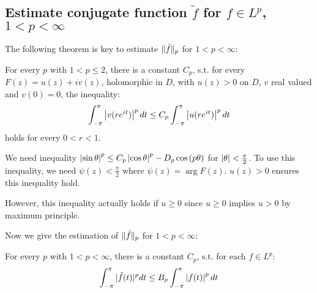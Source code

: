 \subsection{Estimate conjugate function $\tilde{f}$ for $f\in L^p$, $1<p<\infty$}
The following theorem is key to estimate $\lVert\tilde{f}\rVert_p$ for $1<p<\infty$:
\begin{theorem}\label{Marcel Riesz theorem}
    For every $p$ with $1<p\leq 2$, there is a constant $C_p$, s.t. for every $F(z)=u(z)+iv(z)$, holomorphic in $D$, with $u(z)>0$ on $D$, $v$ real valued and $v(0)=0$, the inequality:
    \begin{equation*}
        \int_{-\pi}^{\pi}{\left\lvert v(re^{it})\right\rvert^p d t}\leq C_p \int_{-\pi}^{\pi}{\left\lvert u(re^{it})\right\rvert^p d t}
    \end{equation*}
    holds for every $0<r<1$.
\end{theorem}
\begin{remark}
    We need inequality $\left\lvert\sin{\theta}\right\rvert^p\leq C_p\left\lvert\cos{\theta}\right\rvert^p-D_p\cos{(p\theta)}$ for $\left\lvert\theta\right\rvert<\frac{\pi}{2}$. To use this
    inequality, we need $\psi(z)<\frac{\pi}{2}$ where $\psi(z)=\arg{F(z)}$. $u(z)>0$ ensures this inequality hold.\par
    However, this inequality actually holds if $u\geq 0$ since $u\geq 0$ implies $u>0$ by maximum principle.
\end{remark}
Now we give the estimation of $\lVert\tilde{f}\rVert_p$ for $1<p<\infty$:
\begin{corollary}\label{thm: Marcel Riesz inequality}
    For every $p$ with $1<p<\infty$, there is a constant $C_p$, s.t. for each $f\in L^p$:
    \begin{equation}\label{ieq: Marcel Riesz inequality}
        \int_{-\pi}^{\pi}{\lvert\tilde{f}(t)\rvert^p d t}\leq B_p \int_{-\pi}^{\pi}{\left\lvert f(t)\right\rvert^p d t}
    \end{equation}
\end{corollary}
